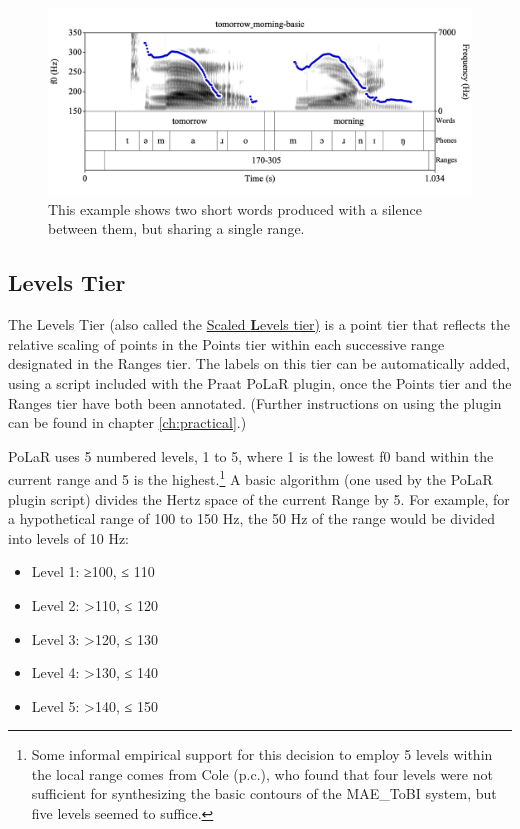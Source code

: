 \documentclass[11pt, twoside]{memoir}
\begin{document}
\begin{figure}[H]
\centering
%
\includegraphics[width=.875\linewidth]{Ranges-tomorrow_morning-basic.png}
%
\caption{This example shows two short words produced with a silence between them, but sharing a single range.%
\label{fig:tomorrow_morning Ranges basic}%
%
}
\end{figure}

\subsection{Levels Tier}\label{sec:levels}

The Levels Tier (also called the \uline{Scaled \textbf{L}evels tier)} is a point tier that reflects the relative scaling of points in the Points tier within each successive range designated in the Ranges tier. The labels on this tier can be automatically added, using a script included with the Praat PoLaR plugin, once the Points tier and the Ranges tier have both been annotated. (Further instructions on using the plugin can be found in chapter \ref{ch:practical}.)

PoLaR uses 5 numbered levels, 1 to 5, where 1 is the lowest f0 band within the current range and 5 is the highest.\footnote{Some informal empirical support for this decision to employ 5 levels within the local range comes from Cole (p.c.), who found that four levels were not sufficient for synthesizing the basic contours of the MAE\_ToBI system, but five levels seemed to suffice.} A basic algorithm (one used by the PoLaR plugin script) divides the Hertz space of the current Range by 5. For example, for a hypothetical range of 100 to 150 Hz, the 50 Hz of the range would be divided into levels of 10 Hz:

\begin{itemize}
\item Level 1: ≥100, ≤ 110
\item Level 2: >110, ≤ 120
\item Level 3: >120, ≤ 130
\item Level 4: >130, ≤ 140
\item Level 5: >140, ≤ 150 \end{itemize}
\end{document}
